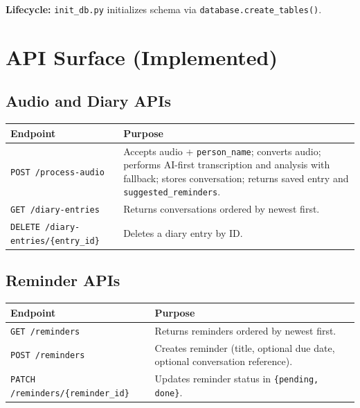 \documentclass[12pt,a4paper]{article}
\begin{document}
\textbf{Lifecycle:} \texttt{init\_db.py} initializes schema via \texttt{database.create\_tables()}.

\section{API Surface (Implemented)}

\subsection{Audio and Diary APIs}
\begin{longtable}{p{} p{}}
\toprule
\textbf{Endpoint} & \textbf{Purpose} \\
\midrule
\endhead
\texttt{POST /process-audio} & Accepts audio + \texttt{person\_name}; converts audio; performs AI-first transcription and analysis with fallback; stores conversation; returns saved entry and \texttt{suggested\_reminders}. \\
\texttt{GET /diary-entries} & Returns conversations ordered by newest first. \\
\texttt{DELETE /diary-entries/\{entry\_id\}} & Deletes a diary entry by ID. \\
\bottomrule
\end{longtable}

\subsection{Reminder APIs}
\begin{longtable}{p{} p{}}
\toprule
\textbf{Endpoint} & \textbf{Purpose} \\
\midrule
\endhead
\texttt{GET /reminders} & Returns reminders ordered by newest first. \\
\texttt{POST /reminders} & Creates reminder (title, optional due date, optional conversation reference). \\
\texttt{PATCH /reminders/\{reminder\_id\}} & Updates reminder status in \texttt{\{pending, done\}}. \\
\bottomrule
\end{longtable}
\end{document}
